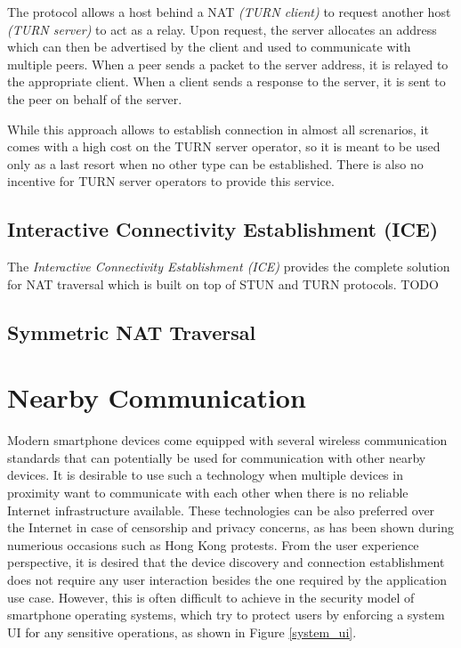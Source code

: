 The protocol allows a host behind a NAT \textit{(TURN client)} to request another host \textit{(TURN server)} to act as a relay. Upon request, the server allocates an address which can then be advertised by the client and used to communicate with multiple peers. When a peer sends a packet to the server address, it is relayed to the appropriate client. When a client sends a response to the server, it is sent to the peer on behalf of the server.

While this approach allows to establish connection in almost all screnarios, it comes with a high cost on the TURN server operator, so it is meant to be used only as a last resort when no other type can be established. There is also no incentive for TURN server operators to provide this service.

\subsection{Interactive Connectivity Establishment (ICE)}

The \textit{Interactive Connectivity Establishment (ICE)} \cite{ice} provides the complete solution for NAT traversal which is built on top of STUN and TURN protocols. TODO


\subsection{Symmetric NAT Traversal}

\section{Nearby Communication}

Modern smartphone devices come equipped with several wireless communication standards that can potentially be used for communication with other nearby devices. It is desirable to use such a technology when multiple devices in proximity want to communicate with each other when there is no reliable Internet infrastructure available. These technologies can be also preferred over the Internet in case of censorship and privacy concerns, as has been shown during numerious occasions such as Hong Kong protests. From the user experience perspective, it is desired that the device discovery and connection establishment does not require any user interaction besides the one required by the application use case. However, this is often difficult to achieve in the security model of smartphone operating systems, which try to protect users by enforcing a system UI for any sensitive operations, as shown in Figure \ref{system_ui}.

